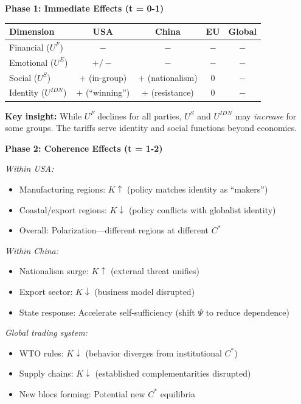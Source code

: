 \documentclass[12pt,a4paper]{article}
\begin{document}
\textbf{Phase 1: Immediate Effects (t = 0-1)}
\begin{center}
\renewcommand{\arraystretch}{1.2}
\begin{tabular}{lcccc}
\hline
\textbf{Dimension} & \textbf{USA} & \textbf{China} & \textbf{EU} & \textbf{Global} \\
\hline
Financial ($U^F$) & $-$ & $-$ & $-$ & $-$ \\
Emotional ($U^E$) & $+/-$ & $-$ & $-$ & $-$ \\
Social ($U^S$) & $+$ (in-group) & $+$ (nationalism) & $0$ & $-$ \\
Identity ($U^{IDN}$) & $+$ (``winning'') & $+$ (resistance) & $0$ & $-$ \\
\hline
\end{tabular}
\end{center}

\textbf{Key insight:} While $U^F$ declines for all parties,
$U^S$ and $U^{IDN}$ may \emph{increase} for some groups.
The tariffs serve identity and social functions beyond economics.

\textbf{Phase 2: Coherence Effects (t = 1-2)}

\emph{Within USA:}
\begin{itemize}
  \item Manufacturing regions: $K \uparrow$ (policy matches identity as ``makers'')
  \item Coastal/export regions: $K \downarrow$ (policy conflicts with globalist identity)
  \item Overall: Polarization---different regions at different $C^*$
\end{itemize}

\emph{Within China:}
\begin{itemize}
  \item Nationalism surge: $K \uparrow$ (external threat unifies)
  \item Export sector: $K \downarrow$ (business model disrupted)
  \item State response: Accelerate self-sufficiency (shift $\Psi$ to reduce dependence)
\end{itemize}

\emph{Global trading system:}
\begin{itemize}
  \item WTO rules: $K \downarrow$ (behavior diverges from institutional $C^*$)
  \item Supply chains: $K \downarrow$ (established complementarities disrupted)
  \item New blocs forming: Potential new $C^*$ equilibria
\end{itemize}
\end{document}
